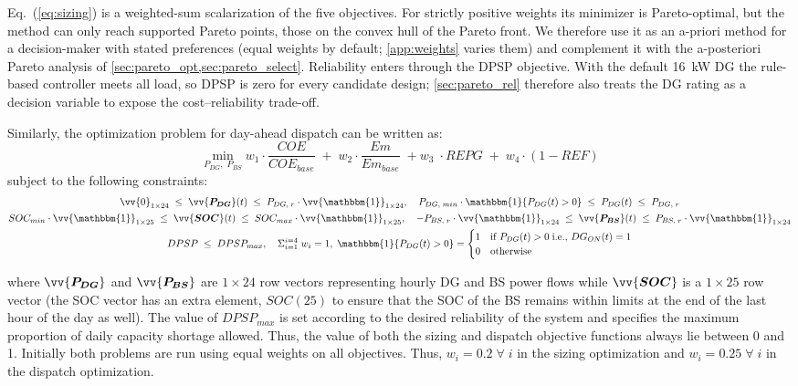 \documentclass[final,3p,times]{elsarticle}
\begin{document}
Eq.~(\ref{eq:sizing}) is a weighted-sum scalarization of the five objectives. For strictly positive weights its minimizer is Pareto-optimal, but the method can only reach supported Pareto points, those on the convex hull of the Pareto front. We therefore use it as an a-priori method for a decision-maker with stated preferences (equal weights by default; \cref{app:weights} varies them) and complement it with the a-posteriori Pareto analysis of \cref{sec:pareto_opt,sec:pareto_select}. Reliability enters through the DPSP objective. With the default 16~kW DG the rule-based controller meets all load, so DPSP is zero for every candidate design; \cref{sec:pareto_rel} therefore also treats the DG rating as a decision variable to expose the cost--reliability trade-off.

Similarly, the optimization problem for day-ahead dispatch can be written as:
\begin{equation}
    \label{eq:dispatch}
    \min_{P_{DG}, \; P_{BS}} w_1 \cdot \frac{COE}{COE_{base}} \; + \; w_2 \cdot \frac{Em}{Em_{base}} \; + w_3 \; \cdot REPG \; + \; w_4 \cdot (1-REF)
\end{equation}
subject to the following constraints:
\begin{gather*}
\vv{0}_{1\times24} \; \leq \; \vv{\bm{P_{DG}}}(t) \; \leq \; P_{DG,\;r}\cdot \vv{\mathbbm{1}}_{1\times24}, \quad P_{DG,\;min} \cdot \mathbbm{1}\{P_{DG}(t) > 0\} \; \leq \; P_{DG}(t) \; \leq \; P_{DG,\;r} \\
SOC_{min}\cdot \vv{\mathbbm{1}}_{1\times25} \; \leq \;\vv{\bm{SOC}}(t) \;\leq\; SOC_{max}\cdot \vv{\mathbbm{1}}_{1\times25}, \quad -P_{BS,\;r}\cdot \vv{\mathbbm{1}}_{1\times24} \;\leq \;\vv{\bm{P_{BS}}}(t) \; \leq \; P_{BS,\;r}\cdot \vv{\mathbbm{1}}_{1\times24} \\
DPSP \; \leq \;DPSP_{max}, \quad \Sigma_{i=1}^{i=4} \; w_i  = 1, \; \mathbbm{1}\{P_{DG}(t) > 0\} = 
\begin{cases} 
    1 & \text{if } P_{DG}(t) > 0 \; \text{i.e., } DG_{ON}(t) = 1\\
    0 & \text{otherwise}
\end{cases} 
\end{gather*}

where $\vv{\bm{P_{DG}}}$ and $\vv{\bm{P_{BS}}}$ are $1\times24$ row vectors representing hourly DG and BS power flows while $\vv{\bm{SOC}}$ is a $1\times25$ row vector (the SOC vector has an extra element, $SOC(25)$ to ensure that the SOC of the BS remains within limits at the end of the last hour of the day as well). The value of $DPSP_{max}$ is set according to the desired reliability of the system and specifies the maximum proportion of daily capacity shortage allowed. Thus, the value of both the sizing and dispatch objective functions always lie between 0 and 1. Initially both problems are run using equal weights on all objectives. Thus, $w_i = 0.2 \; \forall \; i$ in the sizing optimization and $w_i = 0.25 \; \forall \; i$ in the dispatch optimization. 
\end{document}
